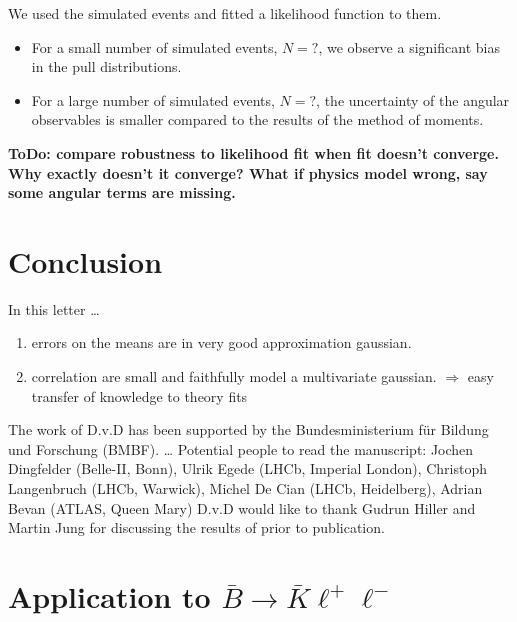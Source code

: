 \documentclass[aps,prd,reprint,nofootinbib,preprintnumbers]{revtex4}
\newcommand{\todo}[1]{{\color{red}\bf ToDo: #1}}
\newcommand{\danny}[1]{{\color{purple}#1}}
\newcommand{\fred}[1]{{\color{brown!85!black}#1}}
\begin{document}
We used the simulated events and fitted a likelihood function to them.
\begin{itemize}
    \item For a small number of simulated events, \danny{$N=?$}, we observe a significant bias in the pull distributions.
    \item For a large number of simulated events, \danny{$N=?$}, the uncertainty of the angular observables is
        smaller compared to the results of the method of moments.
\end{itemize}
\todo{compare robustness to likelihood fit when fit doesn't
converge. Why exactly doesn't it converge? What if physics model
wrong, say some angular terms are missing.}


\section{Conclusion}

In this letter \dots
\begin{enumerate}
    \item errors on the means are in very good approximation gaussian.
    \item correlation are small and faithfully model a multivariate gaussian. \fred{$\Rightarrow$ easy transfer of knowledge to theory fits}
\end{enumerate}


\acknowledgments

The work of D.v.D has been supported by the Bundesministerium f\"ur Bildung und Forschung (BMBF).
\dots
\danny{Potential people to read the manuscript: Jochen Dingfelder (Belle-II, Bonn), Ulrik Egede (LHCb, Imperial London), Christoph Langenbruch (LHCb, Warwick), Michel De Cian (LHCb, Heidelberg), Adrian Bevan (ATLAS, Queen Mary)  }
D.v.D would like to thank Gudrun Hiller and Martin Jung for discussing the results of \cite{Das:2014sra} prior to publication.

\appendix

\section{Application to $\bar{B}\to\bar{K}\ell^+\ell^-$}
\label{app:btokll}
\end{document}
